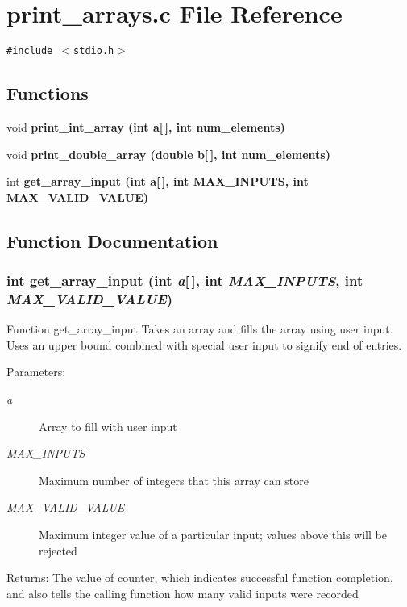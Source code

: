 \section{print\_\-arrays.c File Reference}
\label{print__arrays_8c}
{\tt \#include $<$stdio.h$>$}\par
\subsection*{Functions}
\begin{CompactItemize}
\item 
void \bf{print\_\-int\_\-array} (int a[$\,$], int num\_\-elements)
\item 
void \bf{print\_\-double\_\-array} (double b[$\,$], int num\_\-elements)
\item 
int \bf{get\_\-array\_\-input} (int a[$\,$], int MAX\_\-INPUTS, int MAX\_\-VALID\_\-VALUE)
\end{CompactItemize}


\subsection{Function Documentation}
\subsubsection{\setlength{\rightskip}{0pt plus 5cm}int get\_\-array\_\-input (int {\em a}[$\,$], int {\em MAX\_\-INPUTS}, int {\em MAX\_\-VALID\_\-VALUE})}\label{print__arrays_8c_1b3b1ac8e563b2e586a8a68f22b78240}


Function get\_\-array\_\-input Takes an array and fills the array using user input. Uses an upper bound combined with special user input to signify end of entries.

\begin{Desc}
\item[Parameters:]
\begin{description}
\item[{\em a}]Array to fill with user input \item[{\em MAX\_\-INPUTS}]Maximum number of integers that this array can store \item[{\em MAX\_\-VALID\_\-VALUE}]Maximum integer value of a particular input; values above this will be rejected\end{description}
\end{Desc}
\begin{Desc}
\item[Returns:]The value of counter, which indicates successful function completion, and also tells the calling function how many valid inputs were recorded \end{Desc}
